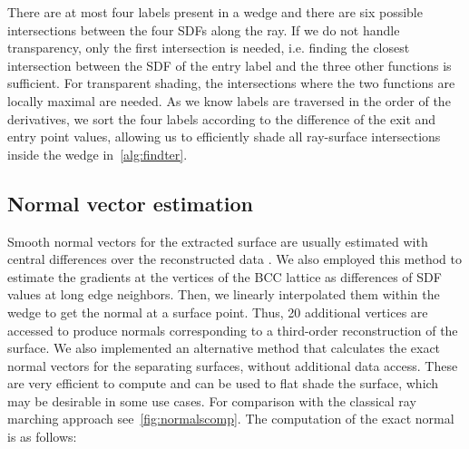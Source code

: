 \documentclass[journal]{vgtc}                     %
\begin{document}
There are at most four labels present in a wedge and there are six possible intersections between the four SDFs along the ray. If we do not handle transparency, only the first intersection is needed, i.e. finding the closest intersection between the SDF of the entry label and the three other functions is sufficient. For transparent shading, the intersections where the two functions are locally maximal are needed.
As we know labels are traversed in the order of the derivatives, we sort the four labels according to the difference of the exit and entry point values, allowing us to efficiently shade all ray-surface intersections inside the wedge in~\cref{alg:findter}.

\subsection{Normal vector estimation} \label{sec:normeval}

Smooth normal vectors for the extracted surface are usually estimated with central differences over the reconstructed data \cite{moller1997comparison}. We also employed this method to estimate the gradients at the vertices of the BCC lattice as differences of SDF values at long edge neighbors. Then, we linearly interpolated them within the wedge to get the normal at a surface point. Thus, 20 additional vertices are accessed to produce normals corresponding to a third-order reconstruction of the surface. We also implemented an alternative method that calculates the exact normal vectors for the separating surfaces, without additional data access. These are very efficient to compute and can be used to flat shade the surface, which may be desirable in some use cases. For comparison with the classical ray marching approach see~\cref{fig:normalscomp}. The computation of the exact normal is as follows:
\end{document}
